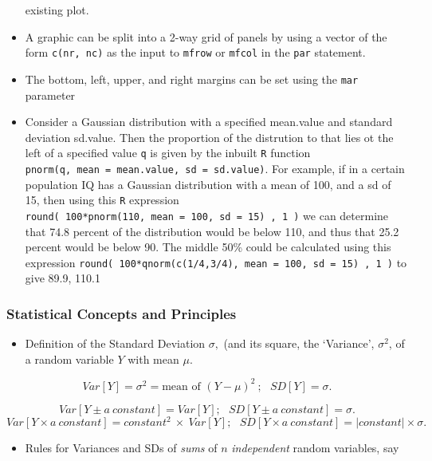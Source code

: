 \documentclass[
]{article}
\providecommand{\tightlist}{%
  \setlength{\itemsep}{0pt}\setlength{\parskip}{0pt}}
\begin{document}
\begin{itemize}
  existing plot.
\item
  A graphic can be split into a 2-way grid of panels by using a vector
  of the form \texttt{c(nr,\ nc)} as the input to \texttt{mfrow} or
  \texttt{mfcol} in the \texttt{par} statement.
\item
  The bottom, left, upper, and right margins can be set using the
  \texttt{mar} parameter
\item
  Consider a Gaussian distribution with a specified mean.value and
  standard deviation sd.value. Then the proportion of the distrution to
  that lies ot the left of a specified value \texttt{q} is given by the
  inbuilt \texttt{R} function
  \texttt{pnorm(q,\ mean\ =\ mean.value,\ sd\ =\ sd.value)}. For
  example, if in a certain population IQ has a Gaussian distribution
  with a mean of 100, and a sd of 15, then using this \texttt{R}
  expression
  \texttt{round(\ 100*pnorm(110,\ mean\ =\ 100,\ sd\ =\ 15)\ ,\ 1\ )} we
  can determine that 74.8 percent of the distribution would be below
  110, and thus that 25.2 percent would be below 90. The middle 50\%
  could be calculated using this expression
  \texttt{round(\ 100*qnorm(c(1/4,3/4),\ mean\ =\ 100,\ sd\ =\ 15)\ ,\ 1\ )}
  to give 89.9, 110.1
\end{itemize}

\hypertarget{statistical-concepts-and-principles}{%
\subsubsection{Statistical Concepts and
Principles}\label{statistical-concepts-and-principles}}

\begin{itemize}
\tightlist
\item
  Definition of the Standard Deviation \(\sigma,\) (and its square, the
  `Variance', \(\sigma^2\), of a random variable \(Y\) with mean
  \(\mu\).
\end{itemize}

\[ Var[Y] = \sigma^2 = \textrm{mean of } (Y - \mu)^2 \ ; \ \ \  SD[Y] = \sigma.\]

\[ Var[Y \pm a \ constant] = Var[Y] ; \ \ \  SD[Y \pm a \ constant] = \sigma.\]
\[ Var[Y \times a \ constant] = constant^2 \ \times \ Var[Y] ; \ \ \  SD[Y \times a \ constant] = |constant| \times \sigma.\]

\begin{itemize}
\tightlist
\item
  Rules for Variances and SDs of \emph{sums} of \(n\) \emph{independent}
  random variables, say
\end{itemize}
\end{document}
